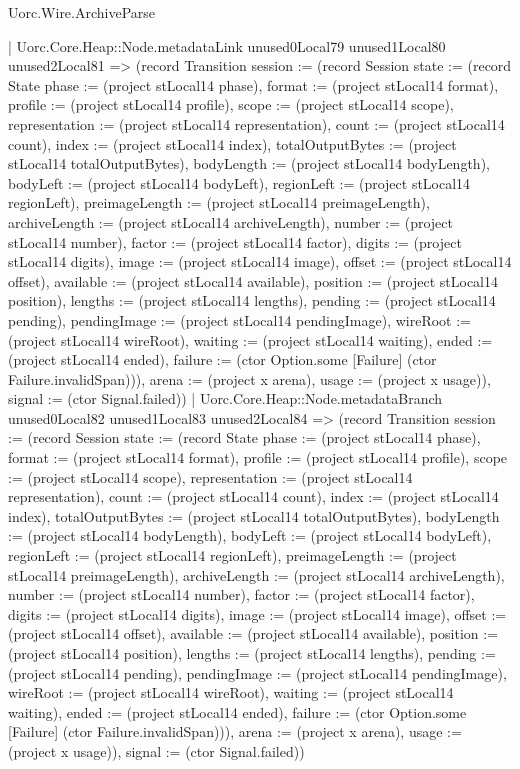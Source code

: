 \begin{lexlean}{Uorc.Wire.ArchiveParse}
\begin{semanticmodule}
{            | Uorc.Core.Heap::Node.metadataLink unused0Local79 unused1Local80 unused2Local81 => (record Transition {session := (record Session {state := (record State {phase := (project stLocal14 phase), format := (project stLocal14 format), profile := (project stLocal14 profile), scope := (project stLocal14 scope), representation := (project stLocal14 representation), count := (project stLocal14 count), index := (project stLocal14 index), totalOutputBytes := (project stLocal14 totalOutputBytes), bodyLength := (project stLocal14 bodyLength), bodyLeft := (project stLocal14 bodyLeft), regionLeft := (project stLocal14 regionLeft), preimageLength := (project stLocal14 preimageLength), archiveLength := (project stLocal14 archiveLength), number := (project stLocal14 number), factor := (project stLocal14 factor), digits := (project stLocal14 digits), image := (project stLocal14 image), offset := (project stLocal14 offset), available := (project stLocal14 available), position := (project stLocal14 position), lengths := (project stLocal14 lengths), pending := (project stLocal14 pending), pendingImage := (project stLocal14 pendingImage), wireRoot := (project stLocal14 wireRoot), waiting := (project stLocal14 waiting), ended := (project stLocal14 ended), failure := (ctor Option.some [Failure] (ctor Failure.invalidSpan))}), arena := (project x arena), usage := (project x usage)}), signal := (ctor Signal.failed)})
            | Uorc.Core.Heap::Node.metadataBranch unused0Local82 unused1Local83 unused2Local84 => (record Transition {session := (record Session {state := (record State {phase := (project stLocal14 phase), format := (project stLocal14 format), profile := (project stLocal14 profile), scope := (project stLocal14 scope), representation := (project stLocal14 representation), count := (project stLocal14 count), index := (project stLocal14 index), totalOutputBytes := (project stLocal14 totalOutputBytes), bodyLength := (project stLocal14 bodyLength), bodyLeft := (project stLocal14 bodyLeft), regionLeft := (project stLocal14 regionLeft), preimageLength := (project stLocal14 preimageLength), archiveLength := (project stLocal14 archiveLength), number := (project stLocal14 number), factor := (project stLocal14 factor), digits := (project stLocal14 digits), image := (project stLocal14 image), offset := (project stLocal14 offset), available := (project stLocal14 available), position := (project stLocal14 position), lengths := (project stLocal14 lengths), pending := (project stLocal14 pending), pendingImage := (project stLocal14 pendingImage), wireRoot := (project stLocal14 wireRoot), waiting := (project stLocal14 waiting), ended := (project stLocal14 ended), failure := (ctor Option.some [Failure] (ctor Failure.invalidSpan))}), arena := (project x arena), usage := (project x usage)}), signal := (ctor Signal.failed)})
}
\end{semanticmodule}
\end{lexlean}
